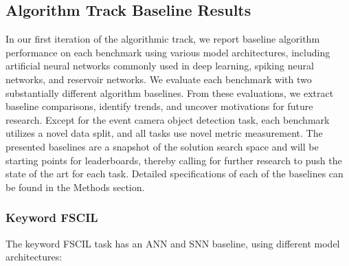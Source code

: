 \subsection*{Algorithm Track Baseline Results}



In our first iteration of the algorithmic track, we report baseline algorithm performance on each benchmark using various model architectures, including artificial neural networks commonly used in deep learning, spiking neural networks, and reservoir networks. We evaluate each benchmark with two substantially different algorithm baselines. From these evaluations, we extract baseline comparisons, identify trends, and uncover motivations for future research. Except for the event camera object detection task, each benchmark utilizes a novel data split, and all tasks use novel metric measurement. The presented baselines are a snapshot of the solution search space and will be starting points for leaderboards, thereby calling for further research to push the state of the art for each task. Detailed specifications of each of the baselines can be found in the Methods section.

    \subsubsection*{Keyword FSCIL}
    

    The keyword FSCIL task has an ANN and SNN baseline, using different model architectures:
    
